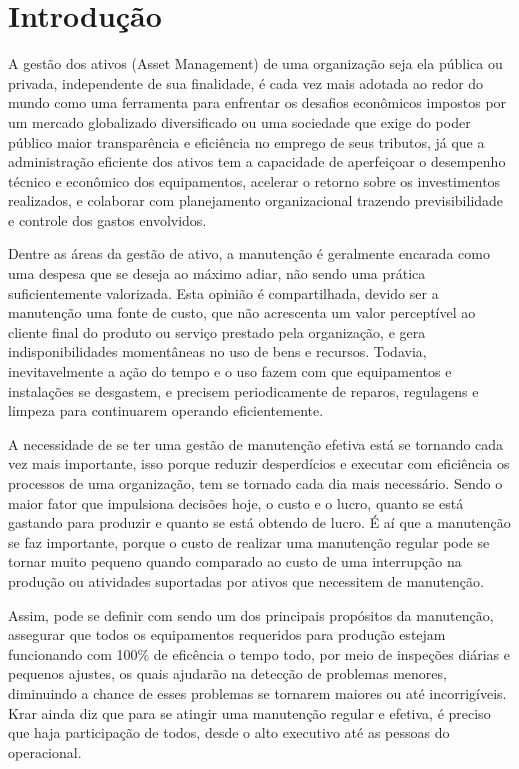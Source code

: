 \chapter{Introdução}
\label{cap-introducao}

A gestão dos ativos (Asset Management) de uma organização seja ela pública ou privada, independente de sua finalidade, é cada vez mais adotada ao redor do mundo como uma ferramenta para enfrentar os desafios econômicos impostos por um mercado globalizado diversificado ou uma sociedade que exige do poder público maior transparência e eficiência no emprego de seus tributos, já que a administração eficiente dos ativos tem a capacidade de aperfeiçoar o desempenho técnico e econômico dos equipamentos, acelerar o retorno sobre os investimentos realizados, e colaborar com planejamento organizacional trazendo previsibilidade e controle dos gastos envolvidos. 

Dentre as áreas da gestão de ativo, a manutenção é geralmente encarada como uma despesa que se deseja ao máximo adiar, não sendo uma prática suficientemente valorizada. Esta opinião é compartilhada, devido ser a manutenção uma fonte de custo, que não acrescenta um valor perceptível ao cliente final do produto ou serviço prestado pela organização, e gera indisponibilidades momentâneas no uso de bens e recursos.
Todavia, inevitavelmente a ação do tempo e o uso fazem com que equipamentos e instalações se desgastem, e precisem periodicamente de reparos, regulagens e limpeza para continuarem operando eficientemente.

A necessidade de se ter uma gestão de manutenção efetiva está se tornando cada vez mais importante, isso porque  reduzir desperdícios e executar com eficiência os processos de uma organização, tem se tornado cada dia mais necessário. Sendo o maior fator que impulsiona decisões hoje, o custo e o lucro, quanto se está gastando para produzir e quanto se está obtendo de lucro. É aí que a manutenção se faz importante, porque o custo de realizar uma manutenção regular pode se tornar muito pequeno quando comparado ao custo de uma interrupção na produção ou atividades suportadas por ativos que necessitem de manutenção.

Assim, pode se definir com sendo um dos principais propósitos da manutenção, assegurar que todos os equipamentos requeridos para produção estejam funcionando com 100\% de eficência o tempo todo, por meio de inspeções diárias e pequenos ajustes, os quais ajudarão na detecção de problemas menores, diminuindo a chance de esses problemas se tornarem maiores ou até incorrigíveis. Krar \cite{krar2009} ainda diz que para se atingir uma manutenção regular e efetiva, é preciso que haja participação de todos, desde o alto executivo até as pessoas do operacional.


